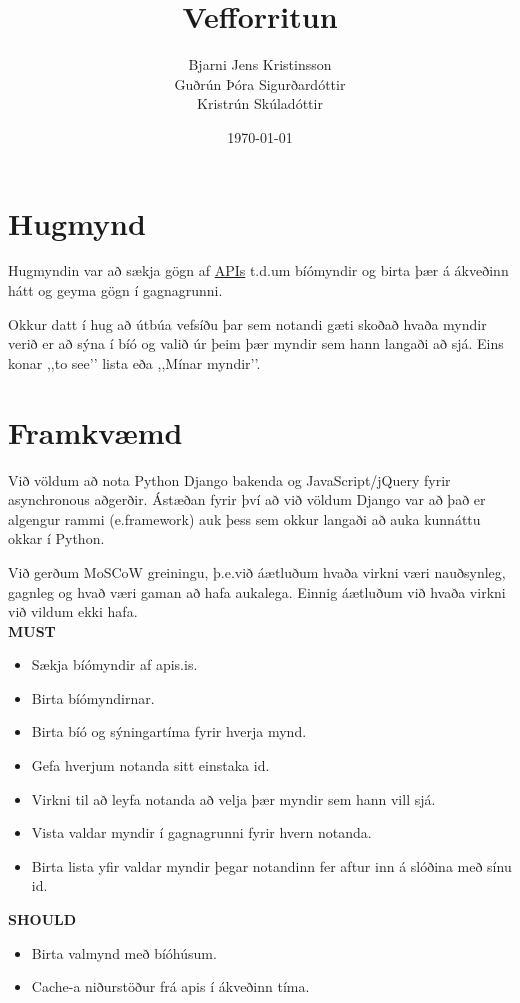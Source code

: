 \documentclass[a4paper,oneside]{article}
\title{Vefforritun}
\date{\today}
\author{Bjarni Jens Kristinsson \\ Guðrún Þóra Sigurðardóttir \\ Kristrún Skúladóttir}
\begin{document}
\maketitle

\section{Hugmynd}
Hugmyndin var að sækja gögn af \href{http://docs.apis.is/}{APIs} t.d.\@ um bíómyndir
og birta þær á ákveðinn hátt og geyma gögn í gagnagrunni.

Okkur datt í hug að útbúa vefsíðu þar sem notandi gæti skoðað hvaða myndir verið er
að sýna í bíó og valið úr þeim þær myndir sem hann langaði að sjá. Eins konar ,,to see’’
lista eða ,,Mínar myndir’’.

\section{Framkvæmd}
Við völdum að nota Python Django bakenda og JavaScript/jQuery fyrir asynchronous aðgerðir.
Ástæðan fyrir því að við völdum Django var að það er algengur rammi (e.\@ framework) auk þess
sem okkur langaði að auka kunnáttu okkar í Python.

Við gerðum MoSCoW greiningu, þ.e.\@ við áætluðum hvaða virkni væri nauðsynleg, gagnleg og
hvað væri gaman að hafa aukalega. Einnig áætluðum við hvaða virkni við vildum ekki hafa. \\

\noindent\textbf{MUST}
\begin{itemize} 
    \item Sækja bíómyndir af apis.is.
    \item Birta bíómyndirnar.
    \item Birta bíó og sýningartíma fyrir hverja mynd.
    \item Gefa hverjum notanda sitt einstaka id.
    \item Virkni til að leyfa notanda að velja þær myndir sem hann vill sjá.
    \item Vista valdar myndir í gagnagrunni fyrir hvern notanda.
    \item Birta lista yfir valdar myndir þegar notandinn fer aftur inn á slóðina með sínu id.
\end{itemize}

\noindent\textbf{SHOULD}
\begin{itemize} 
    \item Birta valmynd með bíóhúsum.
    \item Cache-a niðurstöður frá apis í ákveðinn tíma.
\end{itemize}
\end{document}
